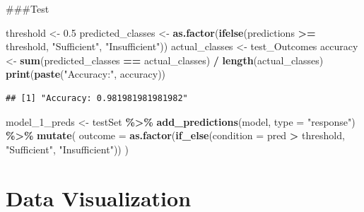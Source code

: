 \documentclass[
  11pt,
]{article}
\newenvironment{Shaded}{\begin{snugshade}}{\end{snugshade}}
\newcommand{\AttributeTok}[1]{\textcolor[rgb]{0.13,0.29,0.53}{#1}}
\newcommand{\FloatTok}[1]{\textcolor[rgb]{0.00,0.00,0.81}{#1}}
\newcommand{\FunctionTok}[1]{\textcolor[rgb]{0.13,0.29,0.53}{\textbf{#1}}}
\newcommand{\NormalTok}[1]{#1}
\newcommand{\OtherTok}[1]{\textcolor[rgb]{0.56,0.35,0.01}{#1}}
\newcommand{\SpecialCharTok}[1]{\textcolor[rgb]{0.81,0.36,0.00}{\textbf{#1}}}
\newcommand{\StringTok}[1]{\textcolor[rgb]{0.31,0.60,0.02}{#1}}
\begin{document}
\#\#\#Test

\begin{Shaded}
\begin{Highlighting}[]
\NormalTok{threshold }\OtherTok{\textless{}{-}} \FloatTok{0.5}  
\NormalTok{predicted\_classes }\OtherTok{\textless{}{-}} \FunctionTok{as.factor}\NormalTok{(}\FunctionTok{ifelse}\NormalTok{(predictions }\SpecialCharTok{\textgreater{}=}\NormalTok{ threshold, }\StringTok{"Sufficient"}\NormalTok{, }\StringTok{"Insufficient"}\NormalTok{))}
\NormalTok{actual\_classes }\OtherTok{\textless{}{-}}\NormalTok{ test\_Outcomes}
\NormalTok{accuracy }\OtherTok{\textless{}{-}} \FunctionTok{sum}\NormalTok{(predicted\_classes }\SpecialCharTok{==}\NormalTok{ actual\_classes) }\SpecialCharTok{/} \FunctionTok{length}\NormalTok{(actual\_classes)}
\FunctionTok{print}\NormalTok{(}\FunctionTok{paste}\NormalTok{(}\StringTok{"Accuracy:"}\NormalTok{, accuracy))}
\end{Highlighting}
\end{Shaded}

\begin{verbatim}
## [1] "Accuracy: 0.981981981981982"
\end{verbatim}

\begin{Shaded}
\begin{Highlighting}[]
\NormalTok{model\_1\_preds }\OtherTok{\textless{}{-}}\NormalTok{ testSet }\SpecialCharTok{\%\textgreater{}\%}
  \FunctionTok{add\_predictions}\NormalTok{(model, }\AttributeTok{type =} \StringTok{"response"}\NormalTok{) }\SpecialCharTok{\%\textgreater{}\%}
  \FunctionTok{mutate}\NormalTok{(}
    \AttributeTok{outcome =} \FunctionTok{as.factor}\NormalTok{(}\FunctionTok{if\_else}\NormalTok{(}\AttributeTok{condition =}\NormalTok{ pred }\SpecialCharTok{\textgreater{}}\NormalTok{ threshold, }
                      \StringTok{"Sufficient"}\NormalTok{, }\StringTok{"Insufficient"}\NormalTok{))}
\NormalTok{  )}
\end{Highlighting}
\end{Shaded}

\hypertarget{data-visualization}{%
\section{Data Visualization}\label{data-visualization}}
\end{document}
